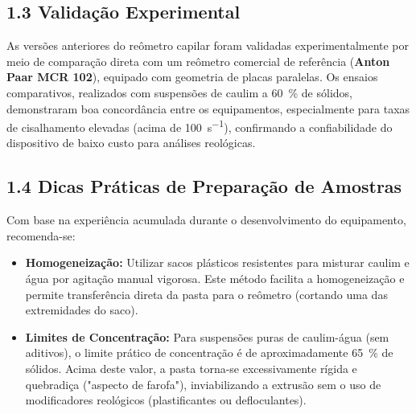\documentclass[a4paper,12pt]{article}
\begin{document}
\subsection*{1.3 Validação Experimental}
As versões anteriores do reômetro capilar foram validadas experimentalmente por meio de comparação direta com um reômetro comercial de referência (\textbf{Anton Paar MCR 102}), equipado com geometria de placas paralelas. Os ensaios comparativos, realizados com suspensões de caulim a \SI{60}{\percent} de sólidos, demonstraram boa concordância entre os equipamentos, especialmente para taxas de cisalhamento elevadas (acima de \SI{100}{s^{-1}}), confirmando a confiabilidade do dispositivo de baixo custo para análises reológicas.

\subsection*{1.4 Dicas Práticas de Preparação de Amostras}
Com base na experiência acumulada durante o desenvolvimento do equipamento, recomenda-se:

\begin{itemize}
  \item \textbf{Homogeneização:} Utilizar sacos plásticos resistentes para misturar caulim e água por agitação manual vigorosa. Este método facilita a homogeneização e permite transferência direta da pasta para o reômetro (cortando uma das extremidades do saco).
  
  \item \textbf{Limites de Concentração:} Para suspensões puras de caulim-água (sem aditivos), o limite prático de concentração é de aproximadamente \SI{65}{\percent} de sólidos. Acima deste valor, a pasta torna-se excessivamente rígida e quebradiça ("aspecto de farofa"), inviabilizando a extrusão sem o uso de modificadores reológicos (plastificantes ou defloculantes).
\end{itemize}
\end{document}
